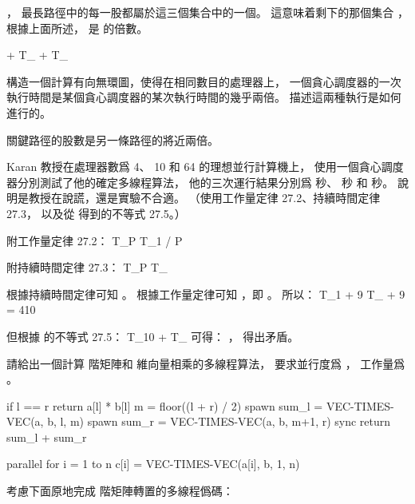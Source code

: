 ，
最長路徑中的每一股都屬於這三個集合中的一個。
這意味着剩下的那個集合 ，
根據上面所述，  是  的倍數。

\startformula
{} + T_{\infty}\le {} + T_{\infty}
\stopformula
\stopANSWER

\startEXERCISE
構造一個計算有向無環圖，使得在相同數目的處理器上，
一個貪心調度器的一次執行時間是某個貪心調度器的某次執行時間的幾乎兩倍。
描述這兩種執行是如何進行的。
\stopEXERCISE

\startANSWER
關鍵路徑的股數是另一條路徑的將近兩倍。
\stopANSWER

\startEXERCISE
Karan 教授在處理器數爲 4、 10 和 64 的理想並行計算機上，
使用一個貪心調度器分別測試了他的確定多線程算法，
他的三次運行結果分別爲  秒、  秒
和  秒。
說明是教授在說謊，還是實驗不合適。
（\hint 使用工作量定律 27.2、持續時間定律 27.3，
以及從 得到的不等式 27.5。）

附工作量定律 27.2：
\startformula
T_P \ge T_1 / P
\stopformula

附持續時間定律 27.3：
\startformula
T_P \ge T_{\infty}
\stopformula
\stopEXERCISE

\startANSWER
根據持續時間定律可知 。
根據工作量定律可知 ，即 。
所以：
\startformula
T_1 + 9 T_{\infty}  + 9  = 410
\stopformula

但根據 的不等式 27.5：
\startformula
T_{10} \le {} + T_{\infty}
\stopformula
可得： ，
得出矛盾。
\stopANSWER

\startEXERCISE[exercise:27.1-6]
請給出一個計算  階矩陣和  維向量相乘的多線程算法，
要求並行度爲 ，
工作量爲 。
\stopEXERCISE

\startANSWER
{}
\startCLRS
if l == r
	return a[l] * b[l]
m = floor((l + r) / 2)
spawn sum_l = VEC-TIMES-VEC(a, b, l, m)
spawn sum_r = VEC-TIMES-VEC(a, b, m+1, r)
sync
return sum_l + sum_r
\stopCLRS

\startCLRS
parallel for i = 1 to n
	c[i] = VEC-TIMES-VEC(a[i], b, 1, n)
\stopCLRS
\stopANSWER

\startEXERCISE[exercise:27.1-7]
考慮下面原地完成  階矩陣轉置的多線程僞碼：

